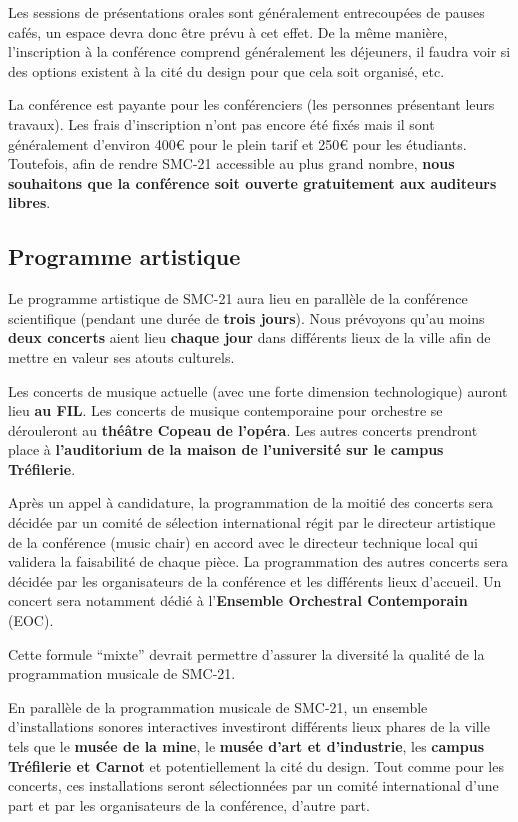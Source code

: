 \documentclass[fontsize=12pt]{scrartcl} %
\numberwithin{equation}{section} %
\numberwithin{figure}{section} %
\numberwithin{table}{section} %
\begin{document}
Les sessions de présentations orales sont généralement entrecoupées de pauses cafés, un espace devra donc être prévu à cet effet. De la même manière, l'inscription à la conférence comprend généralement les déjeuners, il faudra voir si des options existent à la cité du design pour que cela soit organisé, etc.

La conférence est payante pour les conférenciers (les personnes présentant leurs travaux). Les frais d'inscription n'ont pas encore été fixés mais il sont généralement d'environ 400\euro{} pour le plein tarif et 250\euro{} pour les étudiants. Toutefois, afin de rendre SMC-21 accessible au plus grand nombre, \textbf{nous souhaitons que la conférence soit ouverte gratuitement aux auditeurs libres}. 

\subsection{Programme artistique}

Le programme artistique de SMC-21 aura lieu en parallèle de la conférence scientifique (pendant une durée de \textbf{trois jours}). Nous prévoyons qu'au moins \textbf{deux concerts} aient lieu \textbf{chaque jour} dans différents lieux de la ville afin de mettre en valeur ses atouts culturels. 

Les concerts de musique actuelle (avec une forte dimension technologique) auront lieu \textbf{au FIL}. Les concerts de musique contemporaine pour orchestre se dérouleront au \textbf{théâtre Copeau de l'opéra}. Les autres concerts prendront place à \textbf{l'auditorium de la maison de l'université sur le campus Tréfilerie}.

Après un appel à candidature, la programmation de la moitié des concerts sera décidée par un comité de sélection international régit par le directeur artistique de la conférence (music chair) en accord avec le directeur technique local qui validera la faisabilité de chaque pièce. La programmation des autres concerts sera décidée par les organisateurs de la conférence et les différents lieux d'accueil. Un concert sera notamment dédié à l'\textbf{Ensemble Orchestral Contemporain} (EOC). 

Cette formule ``mixte'' devrait permettre d'assurer la diversité la qualité de la programmation musicale de SMC-21.

En parallèle de la programmation musicale de SMC-21, un ensemble d'installations sonores interactives investiront différents lieux phares de la ville tels que le \textbf{musée de la mine}, le \textbf{musée d'art et d'industrie}, les \textbf{campus Tréfilerie et Carnot} et potentiellement la cité du design. Tout comme pour les concerts, ces installations seront sélectionnées par un comité international d'une part et par les organisateurs de la conférence, d'autre part.
\end{document}
